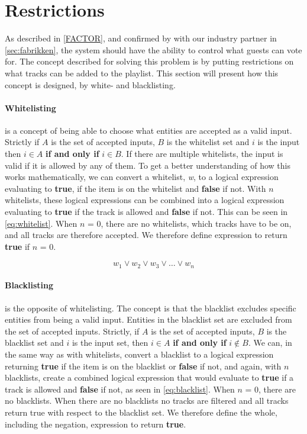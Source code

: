 \section{Restrictions}
\label{sec:restrictions}

As described in \cref{FACTOR}, and confirmed by with our industry partner in \cref{sec:fabrikken}, the system should have the ability to control what guests can vote for. The concept described for solving this problem is by putting restrictions on what tracks can be added to the playlist. This section will present how this concept is designed, by white- and blacklisting.

\paragraph{Whitelisting} is a concept of being able to choose what entities are accepted as a valid input. Strictly if $A$ is the set of accepted inputs, $B$ is the whitelist set and $i$ is the input then $i \in A$ \textbf{if and only if} $i \in B$. If there are multiple whitelists, the input is valid if it is allowed by any of them.
To get a better understanding of how this works mathematically, we can convert a whitelist, \emph{w}, to a logical expression evaluating to \textbf{true}, if the item is on the whitelist and \textbf{false} if not. With $n$ whitelists, these logical expressions can be combined into a logical expression evaluating to \textbf{true} if the track is allowed and \textbf{false} if not. This can be seen in \cref{eq:whitelist}. When $n$ = $0$, there are no whitelists, which tracks have to be on, and all tracks are therefore accepted. We therefore define expression to return \textbf{true} if $n$ = $0$.

\begin{equation}
\label{eq:whitelist}
	w_1 \vee w_2 \vee w_3 \vee \dots \vee w_n
\end{equation}

\paragraph{Blacklisting} is the opposite of whitelisting. The concept is that the blacklist excludes specific entities from being a valid input. Entities in the blacklist set are excluded from the set of accepted inputs. Strictly, if $A$ is the set of accepted inputs, $B$ is the blacklist set and $i$ is the input set, then $i \in A$ \textbf{if and only if} $i \notin B$.
We can, in the same way as with whitelists, convert a blacklist to a logical expression returning \textbf{true} if the item is on the blacklist or \textbf{false} if not, and again, with $n$ blacklists, create a combined logical expression that would evaluate to \textbf{true} if a track is allowed and \textbf{false} if not, as seen in \cref{eq:blacklist}. When $n$ = $0$, there are no blacklists. When there are no blacklists no tracks are filtered and all tracks return true with respect to the blacklist set. We therefore define the whole, including the negation, expression to return \textbf{true}.

